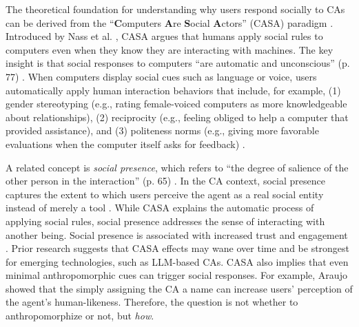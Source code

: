 \documentclass[lettersize,journal]{IEEEtran}
\begin{document}
The theoretical foundation for understanding why users respond socially to CAs can be derived from the ``\textbf{C}omputers \textbf{A}re \textbf{S}ocial \textbf{A}ctors'' (CASA) paradigm \cite{nass2000researching}. Introduced by Nass et al. \cite{nass1994computers}, CASA argues that humans apply social rules to computers even when they know they are interacting with machines. The key insight is that social responses to computers ``are automatic and
unconscious'' (p. 77) \cite{nass1994computers}. When computers display social cues such as language or voice, users automatically apply human interaction behaviors that include, for example, (1) gender stereotyping (e.g., rating female-voiced computers as more knowledgeable about relationships), (2) reciprocity (e.g., feeling obliged to help a computer that provided assistance), and (3) politeness norms (e.g., giving more favorable evaluations when the computer itself asks for feedback) \cite{nass1997machines}. 

A related concept is \textit{social presence}, which refers to ``the degree of salience of the other person in the interaction'' (p. 65) \cite{short1976social}. In the CA context, social presence captures the extent to which users perceive the agent as a real social entity instead of merely a tool \cite{oh2018systematic}. While CASA explains the automatic process of applying social rules, social presence addresses the sense of interacting with another being. Social presence is associated with increased trust and engagement \cite{gunawardena1995social}. Prior research \cite{gambino2020building,koger2023casa} %
suggests that CASA effects may wane over time and be strongest for emerging technologies, such as LLM-based CAs. CASA also implies that even minimal anthropomorphic cues can trigger social responses. For example, Araujo \cite{araujo2018living} showed that the simply assigning the CA a name can increase users' perception of the agent's human-likeness. Therefore, the question is not whether to anthropomorphize or not, but \textit{how}.  %
\end{document}
